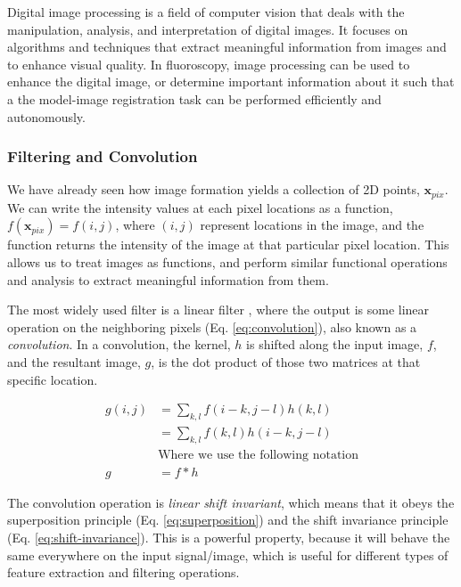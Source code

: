 Digital image processing is a field of computer vision that deals with the manipulation, analysis, and interpretation of digital images. It focuses on algorithms and techniques that extract meaningful information from images and to enhance visual quality. In fluoroscopy, image processing can be used to enhance the digital image, or determine important information about it such that a the model-image registration task can be performed efficiently and autonomously.

\subsubsection{Filtering and Convolution}
\label{sec:filtering-convolution}
We have already seen how image formation yields a collection of 2D points, $\mathbf{x}_{pix}$. We can write the intensity values at each pixel locations as a function, $f(\mathbf{x}_{pix}) = f(i,j)$, where $(i,j)$ represent locations in the image, and the function returns the intensity of the image at that particular pixel location. This allows us to treat images as functions, and perform similar functional operations and analysis to extract meaningful information from them.

The most widely used filter is a linear filter \cite{szeliskiComputerVisionAlgorithms2022}, where the output is some linear operation on the neighboring pixels (Eq. \ref{eq:convolution}), also known as a \emph{convolution}. In a convolution, the kernel, $h$ is shifted along the input image, $f$, and the resultant image, $g$, is the dot product of those two matrices at that specific location.

\begin{equation}
    \begin{aligned}
        g(i,j) &= \sum_{k,l}f(i-k,j-l)h(k,l) \\
        &= \sum_{k,l}f(k,l)h(i-k,j-l) \\
        &\text{Where we use the following notation}\\
        g&= f * h
    \end{aligned}
    \label{eq:convolution}
\end{equation}

The convolution operation is \emph{linear shift invariant}, which means that it obeys the superposition principle (Eq. \ref{eq:superposition}) and the shift invariance principle (Eq. \ref{eq:shift-invariance}). This is a powerful property, because it will behave the same everywhere on the input signal/image, which is useful for different types of feature extraction and filtering operations.

